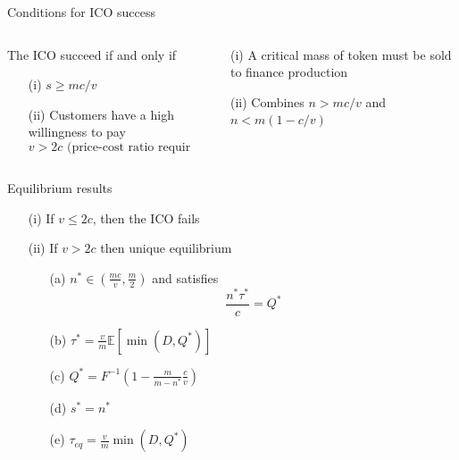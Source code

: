 \documentclass{beamer}
\begin{document}
\begin{frame}{Conditions for ICO success}
\scriptsize
\begin{columns}
\begin{column}{0.5\textwidth}
\begin{tcolorbox}[enhanced,drop shadow, title=Proposition (Condition for ICO success) ]
The ICO succeed if and only if 
\begin{itemize}
  \item[(i)] $s\geq mc/v$ 
  \item[(ii)] Customers have a high willingness to pay
  $$
  v>2c\text{ (price-cost ratio requirement)}
  $$
\end{itemize}
\end{tcolorbox}
\end{column}
\begin{column}{0.5\textwidth}
\begin{tcolorbox}[enhanced,drop shadow, title=Interpretation ]
\begin{itemize}
  \item[(i)] A critical mass of token must be sold to finance production
  \item[(ii)] Combines $n>mc/v$ and $n<m(1-c/v)$
\end{itemize}
\end{tcolorbox}
\end{column}
\end{columns}
\end{frame}
\begin{frame}{Equilibrium results}
\scriptsize

\begin{tcolorbox}[enhanced,drop shadow, title=Proposition ]

\begin{itemize}
  \item[(i)] If $v\leq 2c$, then the ICO fails
  \item[(ii)] If $v>2c$ then unique equilibrium  
  \begin{itemize}
    \scriptsize
    \item[(a)] $n^\ast\in(\frac{mc}{v},\frac{m}{2})$ and satisfies
    $$
    \frac{n^\ast\tau^\ast}{c} = Q^\ast
    $$
    \item[(b)] $\tau^\ast = \frac{v}{m}\mathbb{E}\left[\min(D,Q^\ast)\right]$ 
    \item[(c)] $Q^\ast = F^{-1}\left(1-\frac{m}{m-n^\ast}\frac{c}{v}\right)$ 
    \item[(d)] $s^\ast = n^\ast$
    \item[(e)] $\tau_{eq} = \frac{v}{m}\min(D,Q^\ast)$
  \end{itemize}

\end{itemize}
\end{tcolorbox}

\end{frame}
\end{document}
